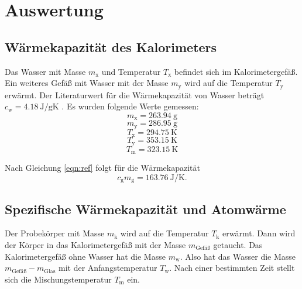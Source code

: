\section{Auswertung}
\label{sec:Auswertung}
\subsection{Wärmekapazität des Kalorimeters}
Das Wasser mit Masse $m_\text{x}$ und Temperatur $T_\text{x}$ befindet sich im Kalorimetergefäß.
Ein weiteres Gefäß mit Wasser mit der Masse $m_\text{y}$ wird auf die Temperatur $T_\text{y}$ erwärmt.
Der Literaturwert für die Wärmekapazität von Wasser beträgt $c_\text{w} = \SI{4.18}{\joule / \gram\kelvin}$ \cite[159]{anleitung}.
Es wurden folgende Werte gemessen:
\begin{equation*}
    m_\text{x} = \SI{263.94}{\gram}
\end{equation*}
\begin{equation*}
    m_\text{y} = \SI{286.95}{\gram}
\end{equation*}
\begin{equation*}
    T_\text{x} = \SI{294.75}{\kelvin}    
\end{equation*}
\begin{equation*}
    T_\text{y} = \SI{353.15}{\kelvin}
\end{equation*}
\begin{equation*}
    T_\text{m} = \SI{323.15}{\kelvin}
\end{equation*}

Nach Gleichung \eqref{eqn:ref} folgt für die Wärmekapazität
\begin{equation}
    c_\text{g}m_\text{g} = \SI{163.76}{\joule/\kelvin} .
\end{equation}

\subsection{Spezifische Wärmekapazität und Atomwärme}
Der Probekörper mit Masse $m_\text{k}$ wird auf die Temperatur $T_\text{k}$ erwärmt.
Dann wird der Körper in das Kalorimetergefäß mit der Masse $m_\text{Gefäß}$ getaucht.
Das Kalorimetergefäß ohne Wasser hat die Masse $m_\text{w}$.
Also hat das Wasser die Masse $m_\text{Gefäß}-m_\text{Glas}$ mit der Anfangstemperatur $T_\text{w}$.
Nach einer bestimmten Zeit stellt sich die Mischungstemperatur $T_\text{m}$ ein.
